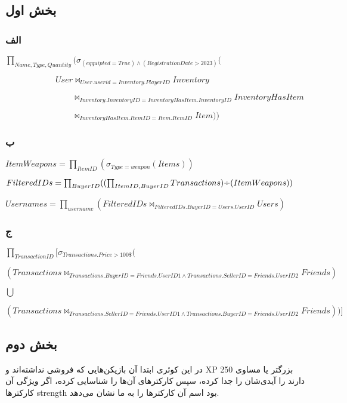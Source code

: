 \subsection*{بخش اول}

\subsubsection*{الف}

\setLTR
$\prod_{Name,Type,Quantity}(\sigma_{(eqquipted=True)\land(Registration Date > 2023)}($

 $\qquad \qquad \qquad User \bowtie_{User.userid=Inventory.PlayerID}Inventory$

 $\qquad \qquad \qquad \qquad  \bowtie_{Inventory.InventoryID = InventoryHasItem.InventoryID}InventoryHasItem$
 
 $\qquad \qquad \qquad \qquad  \bowtie_{InventoryHasItem.ItemID=Item.ItemID}Item))$
\setRTL

\subsubsection*{ب}

\setLTR
$ItemWeapons =\prod_{ItemID} (\sigma_{Type=weapon}(Items))$

$FilteredIDs = \prod_{BuyerID}((\prod_{ItemID,BuyerID}Transactions) \text{\textdiv} (ItemWeapons))$

$Usernames =\prod_{username} (FilteredIDs \bowtie_{FilteredIDs.BuyerID = Users.UserID} Users)$
\setRTL

\subsubsection*{ج}

\setLTR
$\prod_{TransactionID}[\sigma_{Transactions.Price>100\$}($

$(Transactions\bowtie_{Transactions.BuyerID=Friends.UserID1 \land Transactions.SellerID=Friends.UserID2}Friends)$

$\bigcup$

$(Transactions\bowtie_{Transactions.SellerID=Friends.UserID1 \land Transactions.BuyerID=Friends.UserID2}Friends))]$

\setRTL
	
\subsection*{بخش دوم}

در این کوئری ابتدا آن بازیکن‌هایی که فروشی نداشته‌اند و XP بزرگتر یا مساوی 250 دارند را آیدی‌شان را جدا کرده، سپس کارکترهای آن‌ها را شناسایی کرده، اگر ویژگی آن کارکترها strength بود اسم آن‌ کارکترها را به ما نشان می‌دهد.

